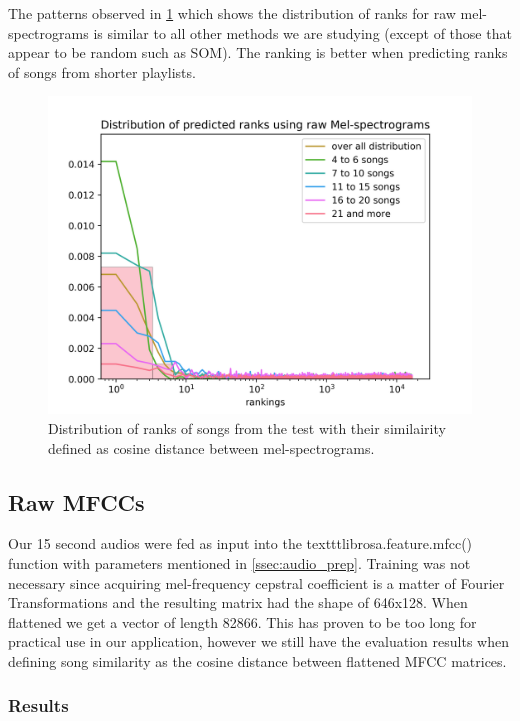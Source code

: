 The patterns observed in \ref{fig:mel_graph} which shows the distribution of ranks for raw mel-spectrograms is similar to all other methods we are studying (except of those that appear to be random such as SOM). The ranking is better when predicting ranks of songs from shorter playlists. 

\begin{figure}[hbt!]
    \centering
	\includegraphics[width=120mm]{./img/mel_graph.png}
	\caption{Distribution of ranks of songs from the test with their similairity defined as cosine distance between mel-spectrograms.}
	\label{fig:mel_graph}
\end{figure}

\subsection{Raw MFCCs}
Our 15 second audios were fed as input into the texttt{librosa.feature.mfcc()} function with parameters mentioned in \ref{ssec:audio_prep}. Training was not necessary since acquiring mel-frequency cepstral coefficient is a matter of Fourier Transformations and the resulting matrix had the shape of 646x128. When flattened we get a vector of length 82866. This has proven to be too long for practical use in our application, however we still have the evaluation results when defining song similarity as the cosine distance between flattened MFCC matrices.

\subsubsection{Results}


